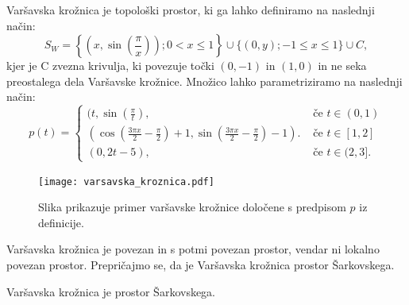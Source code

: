 \documentclass[../TG_magistrsko_delo_sections.tex]{subfiles}
\begin{document}
\begin{definicija}\label{def:vk}
Varšavska krožnica je topološki prostor, ki ga lahko definiramo na naslednji način:
$$S_W = \left\{\left(x, \sin\left(\frac{\pi}{x}\right)\right); 0 < x \leq 1\right\} \cup \{(0, y); -1 \leq x \leq 1\} \cup C,$$
kjer je C zvezna krivulja, ki povezuje točki $(0,-1)$ in $(1,0)$ in ne seka preostalega dela Varšavske krožnice.
Množico lahko parametriziramo na naslednji način:
\[ p(t) = \begin{cases}
  (t, \sin(\frac{\pi}{t}), & \mbox{ če $t \in (0, 1) $}\\
 (\cos(\frac{3\pi x}{2}-\frac{\pi}{2})+1, \sin(\frac{3\pi x}{2}-\frac{\pi}{2})-1). & \mbox{ če $t \in [1, 2]$}\\
  (0, 2t-5), & \mbox{ če $t \in (2, 3]$.}
  \end{cases}
  \]
\end{definicija}

\begin{figure}[h]
  \centering
  \texttt{[image: varsavska\_kroznica.pdf]}
  \caption[Varšavska krožnica]{Slika prikazuje primer varšavske krožnice določene s predpisom $p$ iz definicije.}
  \label{fig:varsavska-kroznica}
\end{figure}

Varšavska krožnica je povezan in s potmi povezan prostor, vendar ni lokalno povezan prostor. Prepričajmo se, da je Varšavska krožnica prostor Šarkovskega.

\begin{trditev}
Varšavska krožnica je prostor Šarkovskega.
\end{trditev}

\end{document}
